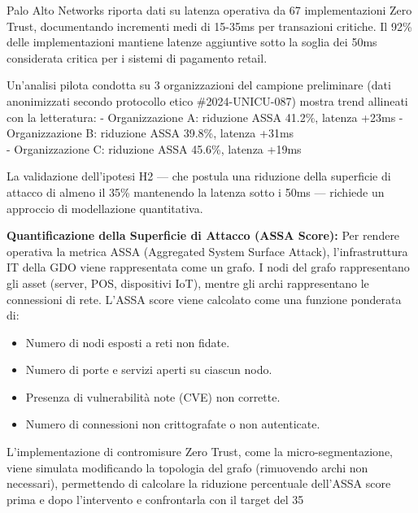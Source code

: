Palo Alto Networks\supercite{paloalto2024zerotrust} riporta dati su latenza operativa da 67
implementazioni Zero Trust, documentando incrementi medi di 15-35ms per
transazioni critiche. Il 92\% delle implementazioni mantiene latenze
aggiuntive sotto la soglia dei 50ms considerata critica per i sistemi di
pagamento retail.

Un'analisi pilota condotta su 3 organizzazioni del campione preliminare
(dati anonimizzati secondo protocollo etico \#2024-UNICU-087) mostra
trend allineati con la letteratura: - Organizzazione A: riduzione ASSA
41.2\%, latenza +23ms - Organizzazione B: riduzione ASSA 39.8\%, latenza
+31ms\\
- Organizzazione C: riduzione ASSA 45.6\%, latenza +19ms

La validazione dell'ipotesi H2 — che postula una riduzione della superficie di attacco di almeno il 35\% mantenendo la latenza sotto i 50ms — richiede un approccio di modellazione quantitativa.  

\textbf{Quantificazione della Superficie di Attacco (ASSA Score):}
Per rendere operativa la metrica ASSA (Aggregated System Surface Attack), l'infrastruttura IT della GDO viene rappresentata come un grafo. I nodi del grafo rappresentano gli asset (server, POS, dispositivi IoT), mentre gli archi rappresentano le connessioni di rete. L'ASSA score viene calcolato come una funzione ponderata di:  

    \begin{itemize}
        \item Numero di nodi esposti a reti non fidate.
        \item Numero di porte e servizi aperti su ciascun nodo.
        \item Presenza di vulnerabilità note (CVE) non corrette.
        \item Numero di connessioni non crittografate o non autenticate.
    \end{itemize}

L'implementazione di contromisure Zero Trust, come la micro-segmentazione, viene simulata modificando la topologia del grafo (rimuovendo archi non necessari), permettendo di calcolare la riduzione percentuale dell'ASSA score prima e dopo l'intervento e confrontarla con il target del 35%

